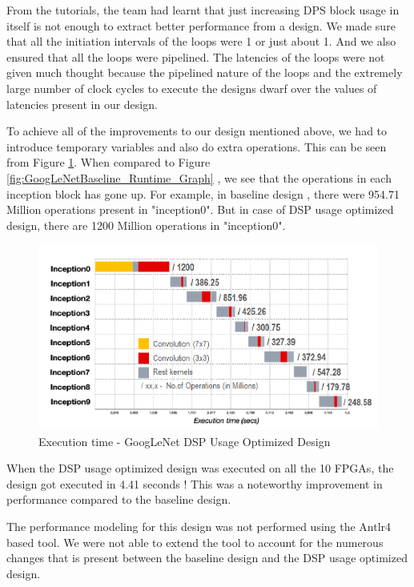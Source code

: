 From the tutorials, the team had learnt that just increasing DPS block usage in itself is not enough to extract better performance from a design. We made sure that all the initiation intervals of the loops were 1 or just about 1. And we also ensured that all the loops were pipelined. The latencies of the loops were not given much thought because the pipelined nature of the loops and the extremely large number of clock cycles to execute the designs dwarf over the values of latencies present in our design.   

To achieve all of the improvements to our design mentioned above, we had to introduce temporary variables and  also do extra operations. This can be seen from Figure \ref{fig:GoogLeNetDSPOpt_Runtime_Graph}. When compared to Figure \ref{fig:GoogLeNetBaseline_Runtime_Graph} , we see that the operations in each inception block has gone up. For example, in baseline design , there were 954.71 Million operations present in "inception0". But in case of DSP usage optimized design, there are 1200 Million operations in "inception0". 

\begin{figure}[!htb]
  \includegraphics[width=\textwidth,height=\textheight,keepaspectratio]{img/GoogLeNetDSPOpt_Runtime_Graph.png}
  \caption{Execution time - GoogLeNet DSP Usage Optimized Design}
  \label{fig:GoogLeNetDSPOpt_Runtime_Graph}
\end{figure}


When the DSP usage optimized design was executed on all the 10 FPGAs, the design got executed in 4.41 seconds ! This was a noteworthy improvement in performance compared to the baseline design. 

The performance modeling for this design was not performed using the Antlr4 based tool. We were not able to extend the tool to account for the numerous changes that is present between the baseline design and the DSP usage optimized design.


